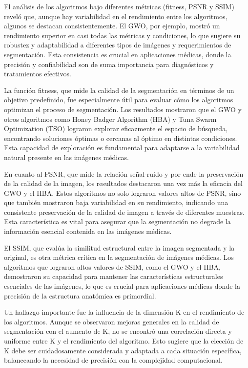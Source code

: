 \documentclass[conference]{IEEEtran}
\begin{document}
\noindent El análisis de los algoritmos bajo diferentes métricas (fitness, PSNR y SSIM) reveló que, aunque hay variabilidad en el rendimiento entre los algoritmos, algunos se destacan consistentemente. El GWO, por ejemplo, mostró un rendimiento superior en casi todas las métricas y condiciones, lo que sugiere su robustez y adaptabilidad a diferentes tipos de imágenes y requerimientos de segmentación. Esta consistencia es crucial en aplicaciones médicas, donde la precisión y confiabilidad son de suma importancia para diagnósticos y tratamientos efectivos.

\noindent La función fitness, que mide la calidad de la segmentación en términos de un objetivo predefinido, fue especialmente útil para evaluar cómo los algoritmos optimizan el proceso de segmentación. Los resultados mostraron que el GWO y otros algoritmos como Honey Badger Algorithm (HBA) y Tuna Swarm Optimization (TSO) lograron explorar eficazmente el espacio de búsqueda, encontrando soluciones óptimas o cercanas al óptimo en distintas condiciones. Esta capacidad de exploración es fundamental para adaptarse a la variabilidad natural presente en las imágenes médicas.

\noindent En cuanto al PSNR, que mide la relación señal-ruido y por ende la preservación de la calidad de la imagen, los resultados destacaron una vez más la eficacia del GWO y el HBA. Estos algoritmos no solo lograron valores altos de PSNR, sino que también mostraron baja variabilidad en su rendimiento, indicando una consistente preservación de la calidad de imagen a través de diferentes muestras. Esta característica es vital para asegurar que la segmentación no degrade la información esencial contenida en las imágenes médicas.

\noindent El SSIM, que evalúa la similitud estructural entre la imagen segmentada y la original, es otra métrica crítica en la segmentación de imágenes médicas. Los algoritmos que lograron altos valores de SSIM, como el GWO y el HBA, demostraron su capacidad para mantener las características estructurales esenciales de las imágenes, lo que es crucial para aplicaciones médicas donde la precisión de la estructura anatómica es primordial.

\noindent Un hallazgo importante fue la influencia de la dimensión K en el rendimiento de los algoritmos. Aunque se observaron mejoras generales en la calidad de segmentación con el aumento de K, no se encontró una correlación directa y uniforme entre K y el rendimiento del algoritmo. Esto sugiere que la elección de K debe ser cuidadosamente considerada y adaptada a cada situación específica, balanceando la necesidad de precisión con la complejidad computacional.
\end{document}
